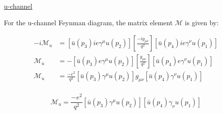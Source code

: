 \documentclass[11pt]{article}
\theoremstyle{definition}
\numberwithin{equation}{section}
\begin{document}
\underline{u-channel}

For the u-channel Feynman diagram, the matrix element $\mathcal{M}$ is given by:

\begin{align}
    -i\mathcal{M}_{u} &= [\bar{u}(p_3)ie\gamma^{\mu}u(p_2)] 
    \left[ \frac{-ig_{\mu\nu}}{q^2} \right]
    [\bar{u}(p_4)ie\gamma^{\nu}u(p_1)]\\
    \mathcal{M}_{u} &= -[\bar{u}(p_3)e\gamma^{\mu}u(p_2)] 
    \left[ \frac{g_{\mu\nu}}{q^2} \right]
    [\bar{u}(p_4)e\gamma^{\nu}u(p_1)]\\
    \mathcal{M}_{u} &= \frac{-e^2}{q^2} [\bar{u}(p_3)\gamma^{\mu}u(p_2)]
    g_{\mu\nu}[\bar{u}(p_4)\gamma^{\nu}u(p_1)]\\
\end{align}

\begin{equation}
\boxed{
    \mathcal{M}_{u} = \frac{-e^2}{q^2} [\bar{u}(p_3)\gamma^{\mu}u(p_2)]
    [\bar{u}(p_4)\gamma_{\nu}u(p_1)]
}
\end{equation}




\end{document}
